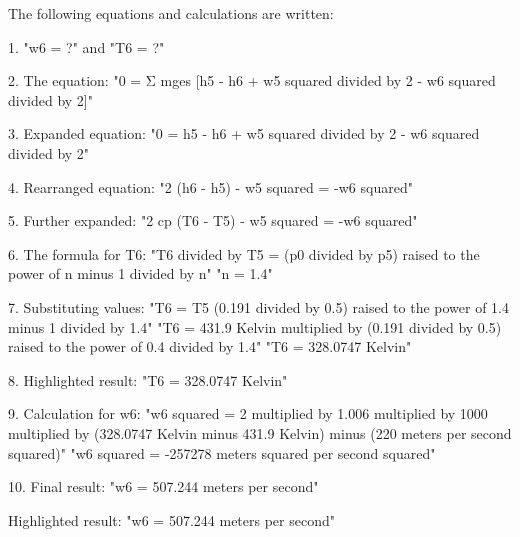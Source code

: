 The following equations and calculations are written:  

1. "w6 = ?" and "T6 = ?"  

2. The equation:  
"0 = Σ mges [h5 - h6 + w5 squared divided by 2 - w6 squared divided by 2]"  

3. Expanded equation:  
"0 = h5 - h6 + w5 squared divided by 2 - w6 squared divided by 2"  

4. Rearranged equation:  
"2 (h6 - h5) - w5 squared = -w6 squared"  

5. Further expanded:  
"2 cp (T6 - T5) - w5 squared = -w6 squared"  

6. The formula for T6:  
"T6 divided by T5 = (p0 divided by p5) raised to the power of n minus 1 divided by n"  
"n = 1.4"  

7. Substituting values:  
"T6 = T5 (0.191 divided by 0.5) raised to the power of 1.4 minus 1 divided by 1.4"  
"T6 = 431.9 Kelvin multiplied by (0.191 divided by 0.5) raised to the power of 0.4 divided by 1.4"  
"T6 = 328.0747 Kelvin"  

8. Highlighted result:  
"T6 = 328.0747 Kelvin"  

9. Calculation for w6:  
"w6 squared = 2 multiplied by 1.006 multiplied by 1000 multiplied by (328.0747 Kelvin minus 431.9 Kelvin) minus (220 meters per second squared)"  
"w6 squared = -257278 meters squared per second squared"  

10. Final result:  
"w6 = 507.244 meters per second"  

Highlighted result:  
"w6 = 507.244 meters per second"